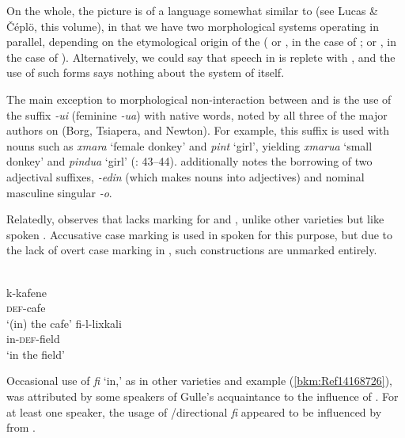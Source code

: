 \documentclass[output=paper]{langsci/langscibook}
\begin{document}
On the whole, the picture is of a language somewhat similar to  (see Lucas \& Čéplö, this volume), in that we have two morphological systems operating in parallel, depending on the etymological origin of the  ( or , in the case of ;  or , in the case of ). Alternatively, we could say that speech in  is replete with , and the use of such  forms says nothing about the system of  itself.


The main exception to morphological non-interaction between  and  is the use of the   suffix \textit{{}-ui} (feminine \textit{{}-ua}) with native  words, noted by all three of the major authors on  (Borg, Tsiapera, and Newton). For example, this suffix is used with  nouns such as \textit{xmara} ‘female donkey’ and \textit{pint} `girl', yielding \textit{xmarua} ‘small donkey’ and \textit{pindua} ‘girl’ (\citealt{Newton1964}: 43–44). \citet{Tsiapera1964} additionally notes the borrowing of two adjectival suffixes, \textit{{}-edin} (which makes nouns into adjectives) and nominal masculine singular \textit{{}-o}.

Relatedly, \citet{Gulle2016} observes that  lacks marking for  and , unlike other  varieties but like spoken . Accusative case marking is used in spoken  for this purpose, but due to the lack of overt case marking in , such constructions are unmarked entirely.


\ea
{}\\
\ea \gll k-kafene\\
     \textsc{def}-cafe  \\
\glt ‘(in) the cafe’
\ex \gll fi-l-lixkali\\
     in-\textsc{def}-field\\
\glt ‘in the field’\label{bkm:Ref14168726} \label{field}
\z
\z


Occasional use of  \textit{fi} ‘in,’ as in other varieties and example (\ref{bkm:Ref14168726}), was attributed by some  speakers of Gulle’s acquaintance to the influence of  . For at least one speaker, the usage of /directional \textit{fi} appeared to be influenced by  from  .
\end{document}
